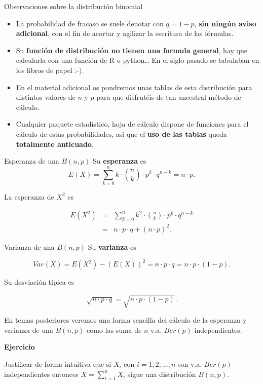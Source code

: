 \documentclass[
  ignorenonframetext,
  aspectratio=169]{beamer}
\providecommand{\tightlist}{%
  \setlength{\itemsep}{0pt}\setlength{\parskip}{0pt}}\usepackage{longtable,booktabs,array}
\begin{document}
\begin{frame}{Observaciones sobre la distribución binomial}
\protect\hypertarget{observaciones-sobre-la-distribuciuxf3n-binomial}{}
\begin{itemize}
\tightlist
\item
  La probabilidad de fracaso se suele denotar con \(q=1-p\), \textbf{sin
  ningún aviso adicional}, con el fin de acortar y agilizar la escritura
  de las fórmulas.
\item
  Su \textbf{función de distribución no tienen una formula general}, hay
  que calcularla con una función de R o python\ldots{} En el siglo
  pasado se tabulaban en los libros de papel :-).
\item
  En el material adicional os pondremos unas tablas de esta distribución
  para distintos valores de \(n\) y \(p\) para que disfrutéis de tan
  ancestral método de cálculo.
\item
  Cualquier paquete estadístico, hoja de cálculo dispone de funciones
  para el cálculo de estas probabilidades, así que el \textbf{uso de las
  tablas} queda \textbf{totalmente anticuado}.
\end{itemize}
\end{frame}

\begin{frame}{Esperanza de una \(B(n,p)\)}
\protect\hypertarget{esperanza-de-una-bnp}{}
Su \textbf{esperanza} es
\[E(X)=\displaystyle\sum_{k=0}^n k \cdot  {n \choose k }\cdot p^k\cdot q^{n-k} = n\cdot p.\]

La esperanza de \(X^2\) es

\begin{eqnarray*}
E(X^2)&=& \displaystyle\sum_{k=0}^n k^2 \cdot  {n \choose k }\cdot p^k\cdot q^{n-k}\\
&=& n\cdot p\cdot q+(n\cdot p)^2.
\end{eqnarray*}
\end{frame}

\begin{frame}{Varianza de una \(B(n,p)\)}
\protect\hypertarget{varianza-de-una-bnp}{}
Su \textbf{varianza} es

\[Var(X)=E(X^2)-\left(E(X)\right)^2=n\cdot p \cdot q=n\cdot p\cdot (1-p).\]

Su desviación típica es

\[\sqrt{n\cdot p\cdot q}=\sqrt{n\cdot p\cdot (1-p)}.\]

En temas posteriores veremos una forma sencilla del cálculo de la
esperanza y varianza de una \(B(n,p)\) como las suma de \(n\) v.a.
\(Ber(p)\) independientes.

\textbf{Ejercicio}

Justificar de forma intuitiva que si \(X_i\) con \(i=1,2,\ldots, n\) son
v.a. \(Ber(p)\) independientes entonces
\(X=\displaystyle\sum_{i=1}^n X_i\) sigue una distribución \(B(n,p).\)
\end{frame}
\end{document}
